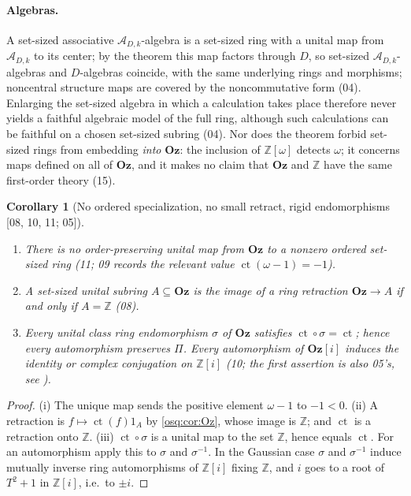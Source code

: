 \documentclass[11pt,letterpaper]{article}
\numberwithin{equation}{section}
\newtheorem{corollary}[corollary]{Corollary}
\theoremstyle{definition}
\theoremstyle{remark}
\theoremstyle{plain}
\newcommand{\Oz}{\mathbf{Oz}}
\newcommand{\GOz}{\Oz[i]}
\newcommand{\Z}{\mathbb Z}
\newcommand{\A}{\mathcal A}          %
\newcommand{\ct}{\operatorname{ct}}
\newcommand{\src}[1]{\textup{\textsf{[#1]}}}
\begin{document}
\paragraph{Algebras.} A set-sized associative $\A_{D,k}$-algebra is a set-sized ring with a
unital map from $\A_{D,k}$ to its center; by the theorem this map factors through $D$, so
set-sized $\A_{D,k}$-algebras and $D$-algebras coincide, with the same underlying rings and
morphisms; noncentral structure maps are covered by the noncommutative form (04).
Enlarging the set-sized algebra in which a calculation takes place therefore never yields
a faithful algebraic model of the full ring, although such calculations can be faithful on
a chosen set-sized subring (04). Nor does the theorem forbid set-sized rings from embedding
\emph{into} $\Oz$: the inclusion of $\Z[\omega]$ detects $\omega$; it concerns maps defined on all of
$\Oz$, and it makes no claim that $\Oz$ and $\Z$ have the same first-order theory (15).

\begin{corollary}[No ordered specialization, no small retract, rigid endomorphisms \src{08, 10, 11; 05}]\label{osq:cor:rigid}
\leavevmode
\begin{enumerate}
\item There is no order-preserving unital map from $\Oz$ to a nonzero ordered set-sized
ring (11; 09 records the relevant value $\ct(\omega-1)=-1$).
\item A set-sized unital subring $A\subseteq\Oz$ is the image of a ring retraction
$\Oz\to A$ if and only if $A=\Z$ (08).
\item Every unital class ring endomorphism $\sigma$ of $\Oz$ satisfies
$\ct\circ\sigma=\ct$; hence every automorphism preserves $\Pi$. Every automorphism of
$\GOz$ induces the identity or complex conjugation on $\Z[i]$ (10; the first assertion is
also 05's, see \cite{RepoOdg}).
\end{enumerate}
\end{corollary}
\begin{proof}
(i) The unique map sends the positive element $\omega-1$ to $-1<0$.
(ii) A retraction is $f\mapsto\ct(f)1_A$ by \cref{osq:cor:Oz}, whose image is $\Z$; and
$\ct$ is a retraction onto $\Z$.
(iii) $\ct\circ\sigma$ is a unital map to the set $\Z$, hence equals $\ct$. For an
automorphism apply this to $\sigma$ and $\sigma^{-1}$. In the Gaussian case $\sigma$ and
$\sigma^{-1}$ induce mutually inverse ring automorphisms of $\Z[i]$ fixing $\Z$, and $i$
goes to a root of $T^2+1$ in $\Z[i]$, i.e.\ to $\pm i$.
\end{proof}
\end{document}
